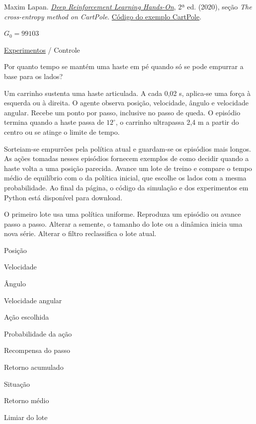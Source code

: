 \noindent Maxim Lapan. \href{https://www.packtpub.com/en-us/product/deep-reinforcement-learning-hands-on-9781838826994}{\emph{Deep Reinforcement Learning Hands-On}}, 2ª ed. (2020), seção \emph{The cross-entropy method on CartPole}. \href{https://github.com/PacktPublishing/Deep-Reinforcement-Learning-Hands-On-Second-Edition/blob/master/Chapter04/01_cartpole.py}{Código do exemplo CartPole}.

$G_0=99103$

\href{index.html}{Experimentos} / Controle

Por quanto tempo se mantém uma haste em pé quando só se pode empurrar a base para os lados?

Um carrinho sustenta uma haste articulada. A cada 0,02 s, aplica-se uma força à esquerda ou à direita. O agente observa posição, velocidade, ângulo e velocidade angular. Recebe um ponto por passo, inclusive no passo de queda. O episódio termina quando a haste passa de $12^\circ$, o carrinho ultrapassa 2,4 m a partir do centro ou se atinge o limite de tempo.

Sorteiam-se empurrões pela política atual e guardam-se os episódios mais longos. As ações tomadas nesses episódios fornecem exemplos de como decidir quando a haste volta a uma posição parecida. Avance um lote de treino e compare o tempo médio de equilíbrio com o da política inicial, que escolhe os lados com a mesma probabilidade. Ao final da página, o código da simulação e dos experimentos em Python está disponível para download.

O primeiro lote usa uma política uniforme. Reproduza um episódio ou avance passo a passo. Alterar a semente, o tamanho do lote ou a dinâmica inicia uma nova série. Alterar o filtro reclassifica o lote atual.

Posição

Velocidade

Ângulo

Velocidade angular

Ação escolhida

Probabilidade da ação

Recompensa do passo

Retorno acumulado

Situação

Retorno médio

Limiar do lote

